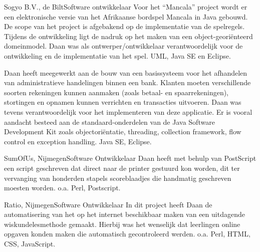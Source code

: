 \begin{workExperience}{Sogyo B.V., de Bilt}{Software ontwikkelaar}{}
		Voor het ``Mancala'' project wordt er een elektronische versie van het 
		Afrikaanse bordspel Mancala in Java gebouwd. De scope van het 
		project is afgebakend op de implementatie van de spelregels. Tijdens
		de ontwikkeling ligt de nadruk op het maken van een 
		object-geori\"enteerd domeinmodel. Daan was als ontwerper/ontwikkelaar
		verantwoordelijk voor de ontwikkeling en de implementatie van het 
		spel.
		\technics UML, Java SE en Eclipse.
		
		Daan heeft meegewerkt aan de bouw van een basissysteem voor het 
		afhandelen van administratieve handelingen binnen een bank. Klanten 
		moeten verschillende soorten rekeningen kunnen aanmaken (zoals betaal- 
		en spaarrekeningen), stortingen en opnamen kunnen verrichten en 
		transacties uitvoeren. Daan was tevens verantwoordelijk voor het 
		implementeren van deze applicatie. 
		Er is vooral aandacht besteed aan de standaard-onderdelen van de Java 
		Software Development Kit zoals objectori\"entatie, threading, collection 
		framework, flow control en exception handling.
		\technics Java SE, Eclipse. 
	\end{workExperience}
	
	\begin{workExperience}{SumOfUs, Nijmegen}{Software Ontwikkelaar}{}
		Daan heeft met behulp van PostScript een script geschreven dat direct 
		naar de printer gestuurd kon worden, dit ter vervanging van honderden 
		stapels scoreblaadjes die handmatig geschreven moesten worden.
		\technics o.a. Perl, Postscript.
	\end{workExperience}

	\begin{workExperience}{Ratio, Nijmegen}{Software Ontwikkelaar}{}
		In dit project heeft Daan de automatisering van het op het internet 
		beschikbaar maken van een uitdagende wiskundelesmethode gemaakt. Hierbij
		was het wenselijk dat leerlingen online opgaven konden maken die 
		automatisch gecontroleerd werden.
		\technics o.a. Perl, HTML, CSS, JavaScript.	
	\end{workExperience}
